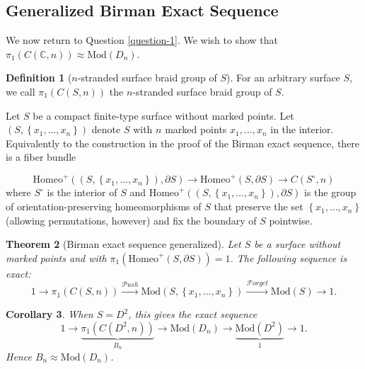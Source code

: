 \documentclass[reqno]{amsart}
\newtheorem{theorem}{Theorem}[section]
\newtheorem{corollary}[theorem]{Corollary}
\theoremstyle{definition}
\newtheorem{definition}[theorem]{Definition}
\theoremstyle{remark}
\newcommand{\Mod}{{\mathrm{Mod}}}
\newcommand{\Homeo}{{\mathrm{Homeo}}}
\newcommand{\Push}{{\mathcal{P}}ush}
\newcommand{\Forget}{{\mathcal{F}}orget}
\begin{document}
 \subsection{Generalized Birman Exact Sequence}

 We now return to Question \ref{question-1}.
 We wish to show that $\pi_1 \left( C
 \left( \mathbb{C},n \right) \right) \approx
 \Mod \left( D_n \right) $. 

 \begin{definition}[$n$-stranded surface braid group of
     $S$]
     For an arbitrary surface $S$, we
     call $\pi_1 \left( C \left( S,n \right)  \right) $ 
     the $n$-stranded surface braid group of $S$.
 \end{definition}

 Let $S$ be a compact finite-type surface without marked
 points. Let $\left( S, \left\{ x_1, \ldots, x_n \right\}  \right) $ 
 denote $S$ with $n$ marked points $x_1, \ldots, x_n$ in
 the interior. Equivalently to the construction
 in the proof of the Birman exact sequence,
 there is a fiber bundle

 \[
 \Homeo^{+} \left( \left( S,
 \left\{ x_1, \ldots, x_n \right\} \right), \partial S  \right) 
 \to \Homeo^{+} \left( S, \partial S \right) 
 \to C \left( S^{\circ},n \right) 
 \]
 where $S^{\circ}$ is the interior of
 $S$ and $\Homeo^{+} \left( \left( S,
 \left\{ x_1,\ldots,x_n \right\} \right) ,\partial S \right) $ 
 is the group of orientation-preserving homeomorphisms
 of $S$ that preserve the set
 $\left\{ x_1,\ldots,x_n \right\} $ (allowing permutations,
 however) and fix the boundary of $S$ pointwise.

 \begin{theorem}[Birman exact sequence generalized]
     \cite[Theorem 9.1]{Farb-Margalit}
     Let $S$ be a surface without marked points
     and with $\pi_1 \left( \Homeo^{+} \left( 
     S, \partial S\right)  \right) = 1$. The following
     sequence is exact:
     \[
     1 \to \pi_1 \left( C \left( S,n \right)  \right) 
     \stackrel{\Push}{\to } \Mod \left( S,
     \left\{ x_1, \ldots, x_n \right\} \right) 
     \stackrel{\Forget}{\to } \Mod (S) \to 1.
     \] 
 \end{theorem}


 \begin{corollary}
     When $S = D^2$, this gives the exact sequence
     \[
         1 \to
         \underbrace{\pi_1 \left( C \left( D^2,n \right)\right)}_{B_n}
     \to \Mod \left( D_n \right) \to 
     \underbrace{\Mod \left( D^2 \right)}_{1} \to 1.
     \] 
     Hence $B_n \approx \Mod \left( D_n \right) $.
 \end{corollary}
\end{document}
